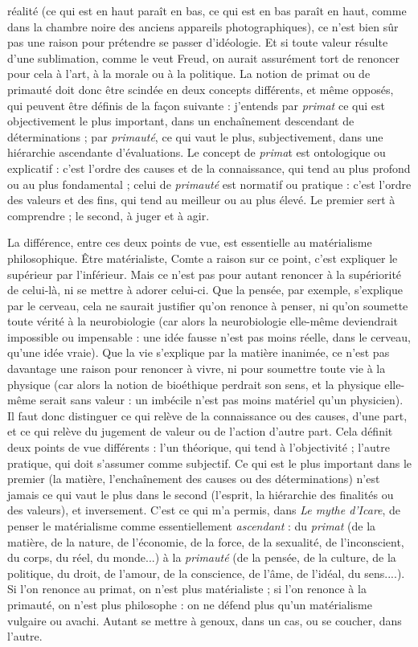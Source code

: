réalité (ce qui est en haut paraît en bas, ce qui est en bas paraît en haut, comme
dans la chambre noire des anciens appareils photographiques), ce n’est bien sûr
pas une raison pour prétendre se passer d’idéologie. Et si toute valeur résulte
d’une sublimation, comme le veut Freud, on aurait assurément tort de
renoncer pour cela à l’art, à la morale ou à la politique. La notion de primat ou
de primauté doit donc être scindée en deux concepts différents, et même
opposés, qui peuvent être définis de la façon suivante : j’entends par {\it primat} ce
qui est objectivement le plus important, dans un enchaînement descendant de
déterminations ; par {\it primauté}, ce qui vaut le plus, subjectivement, dans une
hiérarchie ascendante d'évaluations. Le concept de {\it prima}t est ontologique ou
explicatif : c’est l’ordre des causes et de la connaissance, qui tend au plus profond
ou au plus fondamental ; celui de {\it primauté} est normatif ou pratique : c’est
l’ordre des valeurs et des fins, qui tend au meilleur ou au plus élevé. Le premier
sert à comprendre ; le second, à juger et à agir.

La différence, entre ces deux points de vue, est essentielle au matérialisme
philosophique. Être matérialiste, Comte a raison sur ce point, c’est expliquer le
supérieur par l’inférieur. Mais ce n’est pas pour autant renoncer à la supériorité
de celui-là, ni se mettre à adorer celui-ci. Que la pensée, par exemple,
s'explique par le cerveau, cela ne saurait justifier qu’on renonce à penser, ni
qu’on soumette toute vérité à la neurobiologie (car alors la neurobiologie elle-même
deviendrait impossible ou impensable : une idée fausse n’est pas moins
réelle, dans le cerveau, qu’une idée vraie). Que la vie s'explique par la matière
inanimée, ce n’est pas davantage une raison pour renoncer à vivre, ni pour soumettre
toute vie à la physique (car alors la notion de bioéthique perdrait son
sens, et la physique elle-même serait sans valeur : un imbécile n’est pas moins
matériel qu’un physicien). Il faut donc distinguer ce qui relève de la connaissance
ou des causes, d’une part, et ce qui relève du jugement de valeur ou de
l’action d’autre part. Cela définit deux points de vue différents : l’un théorique,
qui tend à l’objectivité ; l’autre pratique, qui doit s’assumer comme subjectif.
Ce qui est le plus important dans le premier (la matière, l’enchaînement des
causes ou des déterminations) n’est jamais ce qui vaut le plus dans le second
(l'esprit, la hiérarchie des finalités ou des valeurs), et inversement. C’est ce qui
m'a permis, dans {\it Le mythe d'Icare}, de penser le matérialisme comme essentiellement
{\it ascendant} : du {\it primat} (de la matière, de la nature, de l’économie, de la
force, de la sexualité, de l'inconscient, du corps, du réel, du monde...) à la {\it primauté}
(de la pensée, de la culture, de la politique, du droit, de l'amour, de la
conscience, de l’âme, de l’idéal, du sens....). Si l’on renonce au primat, on n’est
plus matérialiste ; si l’on renonce à la primauté, on n’est plus philosophe : on
ne défend plus qu’un matérialisme vulgaire ou avachi. Autant se mettre à
genoux, dans un cas, ou se coucher, dans l’autre.

